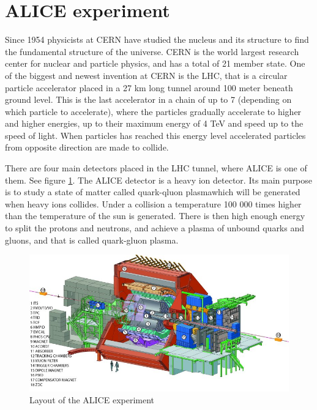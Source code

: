 \documentclass[12pt]{article}
\numberwithin{figure}{section}
\begin{document}
\newpage

\section{ALICE experiment}
Since 1954 physicists at \ac{CERN} have studied the nucleus and its structure to find the fundamental structure of the universe.
\ac{CERN} is the world largest research center for nuclear and particle physics, and has a total of 21 member state.
One of the biggest and newest invention at \ac{CERN} is the \acf{LHC}, that is a circular particle accelerator placed in a 27 km long tunnel around 100 meter beneath ground level.
This is the last accelerator in a chain of up to 7 (depending on which particle to accelerate), where the particles gradually accelerate to higher and higher energies,
up to their maximum energy of 4 TeV and speed up to the speed of light. When particles has reached this energy level accelerated particles from opposite direction are made to collide.

There are four main detectors placed in the \ac{LHC} tunnel, where \ac{ALICE} is one of them. See figure \ref{ALICE_layout}.
The \ac{ALICE} detector is a heavy ion detector. Its main purpose is to study a state of matter called quark-qluon plasma\footnotemark[1] which will be generated when heavy ions collides.
Under a collision a temperature 100 000 times higher than the temperature of the sun is generated.
There is then high enough energy to split the protons and neutrons, and achieve a plasma of unbound quarks and gluons, and that is called quark-gluon plasma.

\begin{figure}[!htbp]
  \centering
  \includegraphics[width=\textwidth]{ALICE_layout.jpg}
  \caption{Layout of the ALICE experiment \cite{website:aliceinfo}}
  \label{ALICE_layout}
\end{figure}
\end{document}
